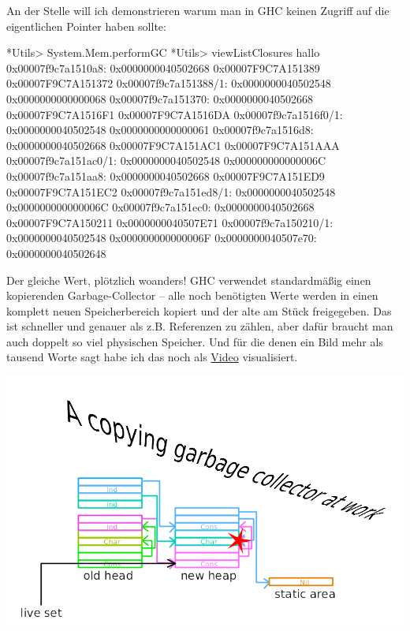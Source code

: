 \documentclass[11pt,DIV=12,parskip=half,headings=normal,abstract]{scrartcl}
\begin{document}
An der Stelle will ich demonstrieren warum man in GHC keinen Zugriff auf die eigentlichen Pointer haben sollte:
\begin{ghci}
*Utils> System.Mem.performGC
*Utils> viewListClosures hallo
0x00007f9c7a1510a8: 0x0000000040502668 0x00007F9C7A151389 0x00007F9C7A151372
0x00007f9c7a151388/1: 0x0000000040502548 0x0000000000000068
0x00007f9c7a151370: 0x0000000040502668 0x00007F9C7A1516F1 0x00007F9C7A1516DA
0x00007f9c7a1516f0/1: 0x0000000040502548 0x0000000000000061
0x00007f9c7a1516d8: 0x0000000040502668 0x00007F9C7A151AC1 0x00007F9C7A151AAA
0x00007f9c7a151ac0/1: 0x0000000040502548 0x000000000000006C
0x00007f9c7a151aa8: 0x0000000040502668 0x00007F9C7A151ED9 0x00007F9C7A151EC2
0x00007f9c7a151ed8/1: 0x0000000040502548 0x000000000000006C
0x00007f9c7a151ec0: 0x0000000040502668 0x00007F9C7A150211 0x0000000040507E71
0x00007f9c7a150210/1: 0x0000000040502548 0x000000000000006F
0x0000000040507e70: 0x0000000040502648
\end{ghci}
Der gleiche Wert, plötzlich woanders! GHC verwendet standardmäßig einen kopierenden Garbage-Collector – alle noch benötigten Werte werden in einen komplett neuen Speicherbereich kopiert und der alte am Stück freigegeben. Das ist schneller und genauer als z.B. Referenzen zu zählen, aber dafür braucht man auch doppelt so viel physischen Speicher. Und für die denen ein Bild mehr als tausend Worte sagt habe ich das noch als \href{run:GC.webm}{Video} visualisiert.
\begin{center}
\includegraphics[width=.6\linewidth]{GC.png}
\end{center}
\end{document}
